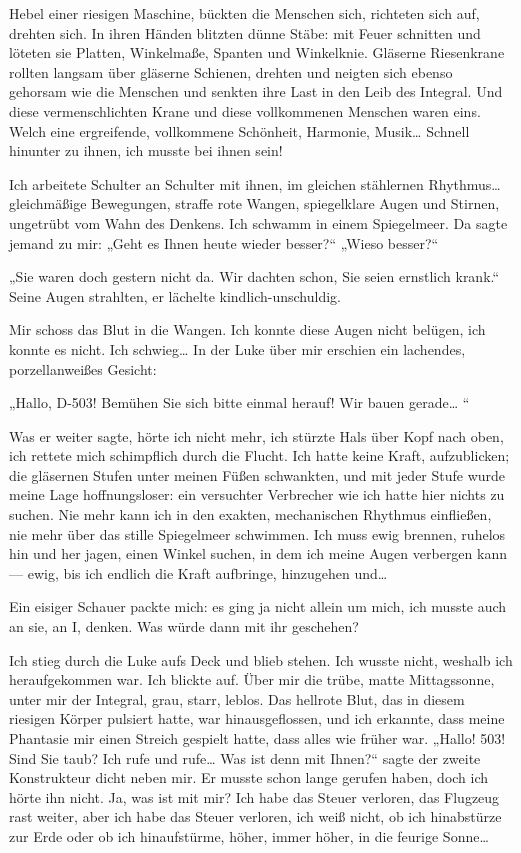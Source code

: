Hebel einer riesigen Maschine, bückten die Menschen sich, richteten
sich auf, drehten sich. In ihren Händen blitzten dünne Stäbe: mit
Feuer schnitten und löteten sie Platten, Winkelmaße, Spanten und
Winkelknie. Gläserne Riesenkrane rollten langsam über gläserne
Schienen, drehten und neigten sich ebenso gehorsam wie die Menschen
und senkten ihre Last in den Leib des Integral. Und diese
vermenschlichten Krane und diese vollkommenen Menschen waren eins.
Welch eine ergreifende, vollkommene Schönheit, Harmonie, Musik\ldots{}
Schnell hinunter zu ihnen, ich musste bei ihnen sein!

Ich arbeitete Schulter an Schulter mit ihnen, im gleichen
stählernen Rhythmus\ldots{} gleichmäßige Bewegungen, straffe rote
Wangen, spiegelklare Augen und Stirnen, ungetrübt vom Wahn des
Denkens. Ich schwamm in einem Spiegelmeer. Da sagte jemand zu mir:
„Geht es Ihnen heute wieder besser?“ „Wieso besser?“

„Sie waren doch gestern nicht da. Wir dachten schon, Sie seien
ernstlich krank.“ Seine Augen strahlten, er lächelte
kindlich-unschuldig.

Mir schoss das Blut in die Wangen. Ich konnte diese Augen nicht
belügen, ich konnte es nicht. Ich schwieg\ldots{} In der Luke über mir
erschien ein lachendes, porzellanweißes Gesicht:

„Hallo, D-503! Bemühen Sie sich bitte einmal herauf! Wir bauen
gerade\ldots{} “

Was er weiter sagte, hörte ich nicht mehr, ich stürzte Hals über
Kopf nach oben, ich rettete mich schimpflich durch die Flucht. Ich
hatte keine Kraft, aufzublicken; die gläsernen Stufen unter meinen
Füßen schwankten, und mit jeder Stufe wurde meine Lage
hoffnungsloser: ein versuchter Verbrecher wie ich hatte hier nichts
zu suchen. Nie mehr kann ich in den exakten, mechanischen Rhythmus
einfließen, nie mehr über das stille Spiegelmeer schwimmen. Ich
muss ewig brennen, ruhelos hin und her jagen, einen Winkel suchen,
in dem ich meine Augen verbergen kann — ewig, bis ich endlich die
Kraft aufbringe, hinzugehen und\ldots{}

Ein eisiger Schauer packte mich: es ging ja nicht allein um mich,
ich musste auch an sie, an I, denken. Was würde dann mit ihr
geschehen?

Ich stieg durch die Luke aufs Deck und blieb stehen. Ich wusste
nicht, weshalb ich heraufgekommen war. Ich blickte auf. Über mir
die trübe, matte Mittagssonne, unter mir der Integral, grau, starr,
leblos. Das hellrote Blut, das in diesem riesigen Körper pulsiert
hatte, war hinausgeflossen, und ich erkannte, dass meine Phantasie
mir einen Streich gespielt hatte, dass alles wie früher war.
„Hallo! 503! Sind Sie taub? Ich rufe und rufe\ldots{} Was ist denn mit
Ihnen?“ sagte der zweite Konstrukteur dicht neben mir. Er musste
schon lange gerufen haben, doch ich hörte ihn nicht. Ja, was ist
mit mir? Ich habe das Steuer verloren, das Flugzeug rast weiter,
aber ich habe das Steuer verloren, ich weiß nicht, ob ich
hinabstürze zur Erde oder ob ich hinaufstürme, höher, immer höher,
in die feurige Sonne\ldots{}

